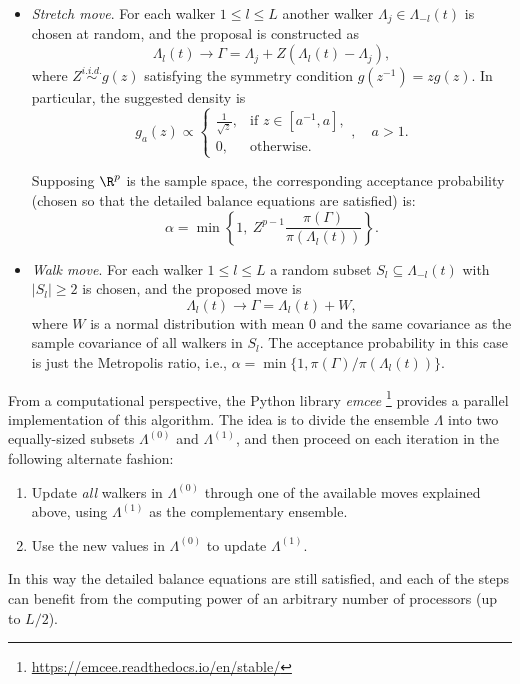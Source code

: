 \begin{itemize}
  \item \textit{Stretch move}. For each walker \(1\leq l \leq L\) another walker \(\Lambda_j \in \Lambda_{-l}(t)\) is chosen at random, and the proposal is constructed as
  \[
    \Lambda_l(t) \to \Gamma = \Lambda_j + Z(\Lambda_l(t) - \Lambda_j),
  \]
  where \(Z \stackrel{i.i.d.}{\sim} g(z)\) satisfying the symmetry condition \(g(z^{-1})=zg(z)\). In particular, the suggested density is
  \[
  g_a(z) \propto \begin{cases}
    \frac{1}{\sqrt{z}}, & \text{if } z \in [a^{-1}, a],\\
    0, & \text{otherwise.}
\end{cases}, \quad a > 1.
  \]

Supposing \(\R^p\) is the sample space, the corresponding acceptance probability (chosen so that the detailed balance equations are satisfied) is:
  \[
    \alpha = \min\left\{1, \ Z^{p-1}\frac{\pi(\Gamma)}{\pi(\Lambda_l(t))}\right\}.
  \]

  \item \textit{Walk move}. For each walker \(1\leq l \leq L\) a random subset \(S_l \subseteq \Lambda_{-l}(t)\) with \(|S_l| \geq 2\) is chosen, and the proposed move is
\[
\Lambda_l(t) \to \Gamma = \Lambda_l(t) + W,
\]
where \(W\) is a normal distribution with mean \(0\) and the same covariance as the sample covariance of all walkers in \(S_l\). The acceptance probability in this case is just the Metropolis ratio, i.e., \(\alpha=\min\{1, \pi(\Gamma)/\pi(\Lambda_l(t))\}\).
\end{itemize}

From a computational perspective, the Python library \textit{emcee} \footnote{\url{https://emcee.readthedocs.io/en/stable/}} \citep{foreman2013emcee} provides a parallel implementation of this algorithm. The idea is to divide the ensemble \(\Lambda\) into two equally-sized subsets \(\Lambda^{(0)}\) and \(\Lambda^{(1)}\), and then proceed on each iteration in the following alternate fashion:

\begin{enumerate}[1.]
  \item Update \textit{all} walkers in \(\Lambda^{(0)}\) through one of the available moves explained above, using \(\Lambda^{(1)}\) as the complementary ensemble.
  \item Use the new values in \(\Lambda^{(0)}\) to update \(\Lambda^{(1)}\).
\end{enumerate}

In this way the detailed balance equations are still satisfied, and each of the steps can benefit from the computing power of an arbitrary number of processors (up to \(L/2\)).
